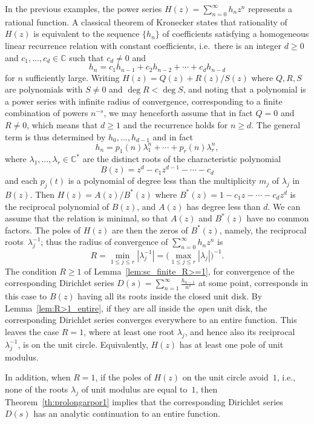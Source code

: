 \documentclass[11pt,a4paper]{amsart}
\newcommand{\C}{\mathbb{C}}
\theoremstyle{plain}
\theoremstyle{plain}
\theoremstyle{plain}
\theoremstyle{definition}
\theoremstyle{remark}
\begin{document}
In the previous examples, the power series $H(z) = \sum_{n=0}^{\infty} h_{n} z^{n}$ represents a rational function. A classical theorem of Kronecker states that rationality of $H(z)$ is equivalent to the sequence $\{h_{n}\}$ of coefficients satisfying a homogeneous linear recurrence relation with constant coefficients, i.e.\ there is an integer $d \geq 0$ and $c_{1}, \ldots, c_{d} \in \C$ such that $c_{d} \neq 0$ and
\[
  h_{n} = c_{1} h_{n-1} + c_{2} h_{n-2} + \cdots + c_{d} h_{n-d}
\]
for $n$ sufficiently large. Writing $H(z) = Q(z) + R(z)/S(z)$ where $Q,R,S$ are polynomials with $S \neq 0$ and $\deg R < \deg S$, and noting that a polynomial is a power series with infinite radius of convergence, corresponding to a finite combination of powers $n^{-s}$, we may henceforth assume that in fact $Q = 0$ and $R \neq 0$, which means that $d \geq 1$ and the recurrence holds for $n \geq d$. The general term is thus determined by $h_{0}, \dots, h_{d-1}$ and in fact
\[
  h_{n} = p_{1}(n) \lambda_{1}^{n} + \cdots + p_{r}(n) \lambda_{r}^{n},
\]
where $\lambda_{1}, \dots, \lambda_{r} \in \C^{*}$ are the distinct roots of the characteristic polynomial
\[
  B(z) = z^{d} - c_{1} z^{d-1} - \cdots - c_{d}
\]
and each $p_{j}(t)$ is a polynomial of degree less than the multiplicity $m_{j}$ of $\lambda_{j}$ in $B(z)$. Then $H(z) = A(z)/B^{*}(z)$ where $B^{*}(z) = 1 - c_{1} z - \cdots - c_{d} z^{d}$ is the reciprocal polynomial of $B(z)$, and $A(z)$ has degree less than $d$. We can assume that the relation is minimal, so that $A(z)$ and $B^{*}(z)$ have no common factors. The poles of $H(z)$ are then the zeros of $B^{*}(z)$, namely, the reciprocal roots~$\lambda_{j}^{-1}$; thus the radius of convergence of $\sum_{n=0}^{\infty} h_{n} z^{n}$ is
\[
  R = \min_{1\le j\le r} |\lambda_{j}^{-1}| = \Big(\max_{1\le j\le r} |\lambda_{j}|\Big)^{-1}.
\]  
The condition $R \geq 1$ of Lemma~\ref{lem:sc_finite_R>=1}, for convergence of the corresponding Dirichlet series $D(s) = \sum_{n=1}^{\infty} \frac{h_{n-1}}{n^{s}}$ at some point, corresponds in this case to $B(z)$ having all its roots inside the closed unit disk. By Lemma~\ref{lem:R>1_entire}, if they are all inside the \emph{open} unit disk, the corresponding Dirichlet series converges everywhere to an entire function. This leaves the case $R=1$, where at least one root $\lambda_{j}$, and hence also its reciprocal $\lambda_{j}^{-1}$, is on the unit circle.
Equivalently, $H(z)$ has at least one pole of unit modulus.

In addition, when $R=1$, if the poles of $H(z)$ on the unit circle avoid~$1$, i.e., none of the roots $\lambda_{j}$ of unit modulus are equal to~$1$, then Theorem~\ref{th:prolongarpor1} implies that the corresponding Dirichlet series $D(s)$ has an analytic continuation to an entire function.
\end{document}
